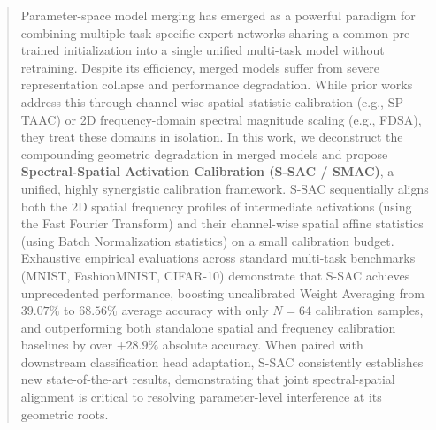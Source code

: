 \documentclass{article}
\theoremstyle{plain}
\theoremstyle{definition}
\theoremstyle{remark}
\begin{document}

\printAffiliationsAndNotice{}

\begin{abstract}
Parameter-space model merging has emerged as a powerful paradigm for combining multiple task-specific expert networks sharing a common pre-trained initialization into a single unified multi-task model without retraining. Despite its efficiency, merged models suffer from severe representation collapse and performance degradation. While prior works address this through channel-wise spatial statistic calibration (e.g., SP-TAAC) or 2D frequency-domain spectral magnitude scaling (e.g., FDSA), they treat these domains in isolation. In this work, we deconstruct the compounding geometric degradation in merged models and propose \textbf{Spectral-Spatial Activation Calibration (S-SAC / SMAC)}, a unified, highly synergistic calibration framework. S-SAC sequentially aligns both the 2D spatial frequency profiles of intermediate activations (using the Fast Fourier Transform) and their channel-wise spatial affine statistics (using Batch Normalization statistics) on a small calibration budget. Exhaustive empirical evaluations across standard multi-task benchmarks (MNIST, FashionMNIST, CIFAR-10) demonstrate that S-SAC achieves unprecedented performance, boosting uncalibrated Weight Averaging from $39.07\%$ to $68.56\%$ average accuracy with only $N=64$ calibration samples, and outperforming both standalone spatial and frequency calibration baselines by over $+28.9\%$ absolute accuracy. When paired with downstream classification head adaptation, S-SAC consistently establishes new state-of-the-art results, demonstrating that joint spectral-spatial alignment is critical to resolving parameter-level interference at its geometric roots.
\end{abstract}
\end{document}
